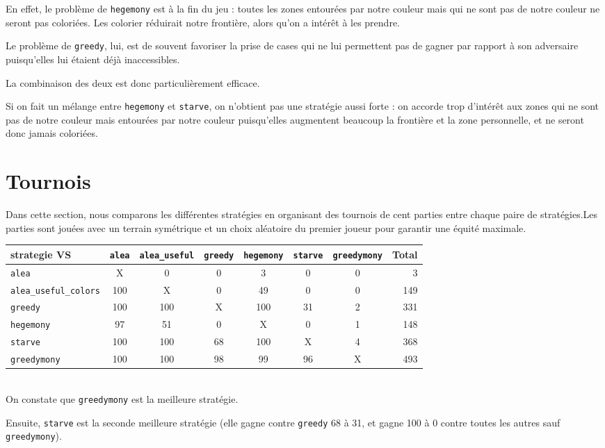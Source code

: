\documentclass[12pt]{article}
\def\sec#1{\section{#1}}
\begin{document}
En effet, le problème de \texttt{hegemony} est à la fin du jeu : toutes les zones entourées par notre couleur mais qui ne sont pas de notre couleur ne seront pas coloriées. Les colorier réduirait notre frontière, alors qu'on a intérêt à les prendre.

Le problème de \texttt{greedy}, lui, est de souvent favoriser la prise de cases qui ne lui permettent pas de gagner par rapport à son adversaire puisqu'elles lui étaient déjà inaccessibles.

La combinaison des deux est donc particulièrement efficace.

Si on fait un mélange entre \texttt{hegemony} et \texttt{starve}, on n'obtient pas une stratégie aussi forte : on accorde trop d'intérêt aux zones qui ne sont pas de notre couleur mais entourées par notre couleur puisqu'elles augmentent beaucoup la frontière et la zone personnelle, et ne seront donc jamais coloriées.

\sec{Tournois}
Dans cette section, nous comparons les différentes stratégies en organisant des tournois de cent parties entre chaque paire de stratégies.Les parties sont jouées avec un terrain symétrique et un choix aléatoire du premier joueur pour garantir une équité maximale.\\


\begin{tabular}{l|c|c|c|c|c|c|r}
strategie VS & \texttt{alea} & \texttt{alea\_useful} & \texttt{greedy} & \texttt{hegemony} & \texttt{starve} & \texttt{greedymony} & Total\\
\hline
\texttt{alea} & X & 0 & 0 & 3 & 0 & 0 & 3\\
\hline
\texttt{alea\_useful\_colors} & 100 & X & 0 & 49 & 0 & 0 & 149\\
\hline
\texttt{greedy} & 100 & 100 & X & 100 & 31 & 2 & 331\\
\hline
\texttt{hegemony} & 97 & 51 & 0 & X & 0 & 1 & 148\\
\hline
\texttt{starve} & 100 & 100 & 68 & 100 & X & 4 & 368\\
\hline
\texttt{greedymony} & 100 & 100 & 98 & 99 & 96 & X & 493\\
\hline
\end{tabular}\\

On constate que \texttt{greedymony} est la meilleure stratégie.

Ensuite, \texttt{starve} est la seconde meilleure stratégie (elle gagne contre \texttt{greedy} 68 à 31, et gagne 100 à 0 contre toutes les autres sauf \texttt{greedymony}).
\end{document}
